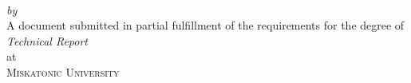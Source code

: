 \begin{titlepage}
  \vspace*{5cm}
  \makeatletter
  \begin{center}
    \begin{Huge}
      \@title
    \end{Huge}\\[0.1cm]
    \emph{by}\\
    \@author
    \vfill
    A document submitted in partial fulfillment
    of the requirements for the degree of\\
    \emph{Technical Report}\\
    at\\
    \textsc{Miskatonic University}
  \end{center}
  \makeatother
\end{titlepage}

\newpage
\null
\thispagestyle{empty}
\newpage